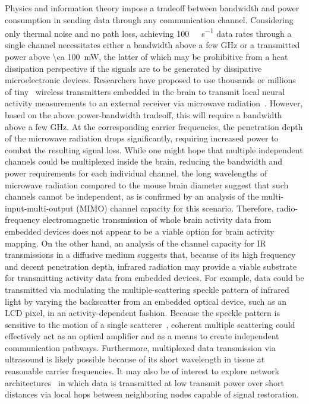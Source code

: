 Physics and information theory impose a tradeoff between bandwidth and power consumption in sending data through any communication channel.
Considering only thermal noise and no path loss, achieving \SI{100}{\giga\bit\per\second} data rates through a single channel necessitates either a bandwidth above a few \si{\giga\hertz} or a transmitted power above \SI{\ca 100}{\milli\watt}, the latter of which may be prohibitive from a heat dissipation perspective if the signals are to be generated by dissipative microelectronic devices.
Researchers have proposed to use thousands or millions of tiny~\cite{gomez10} wireless transmitters embedded in the brain to transmit local neural activity measurements to an external receiver via microwave radiation~\cite{dyson09}.
However, based on the above power-bandwidth tradeoff, this will require a bandwidth above a few \si{\giga\hertz}.
At the corresponding carrier frequencies, the penetration depth of the microwave radiation drops significantly, requiring increased power to combat the resulting signal loss.
While one might hope that multiple independent channels could be multiplexed inside the brain, reducing the bandwidth and power requirements for each individual channel, the long wavelengths of microwave radiation compared to the mouse brain diameter suggest that such channels cannot be independent, as is confirmed by an analysis of the multi-input-multi-output (MIMO) channel capacity for this scenario.
Therefore, radio-frequency electromagnetic transmission of whole brain activity data from embedded devices does not appear to be a viable option for brain activity mapping.
On the other hand, an analysis of the channel capacity for IR transmissions in a diffusive medium suggests that, because of its high frequency and decent penetration depth, infrared radiation may provide a viable substrate for transmitting activity data from embedded devices.
For example, data could be transmitted via modulating the multiple-scattering speckle pattern of infrared light by varying the backscatter from an embedded optical device, such as an LCD pixel, in an activity-dependent fashion.
Because the speckle pattern is sensitive to the motion of a single scatterer~\cite{berkovits91}, coherent multiple scattering could effectively act as an optical amplifier and as a means to create independent communication pathways. Furthermore, multiplexed data transmission via ultrasound is likely possible because of its short wavelength in tissue at reasonable carrier frequencies.
It may also be of interest to explore network architectures~\cite{Bush2011} in which data is transmitted at low transmit power over short distances via local hops between neighboring nodes capable of signal restoration.

